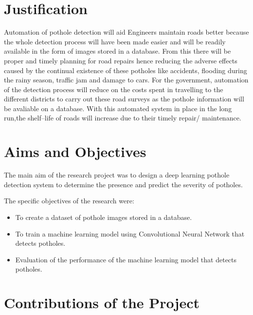 \documentclass[12pt]{report}
\begin{document}
\section{Justification}
Automation of pothole detection will aid Engineers maintain roads better because the whole detection process will have been made easier and will be readily available in the form of images stored in a database. From this there will be proper and timely planning for road repairs hence reducing the adverse effects caused by the continual existence of these potholes like accidents, flooding during the rainy season, traffic jam and damage to cars. For the government, automation of the detection process will reduce on the costs spent in travelling to the different districts to carry out these road surveys as the pothole information will be avaliable on a database. With this automated system in place in the long run,the shelf--life of roads will increase due to their timely repair/ maintenance.




\section{Aims and Objectives}

The main aim of the research project was to design a deep learning  pothole detection system to determine the presence and predict the severity of potholes.

The specific objectives of the research were:

\begin{itemize}[topsep=0pt]

\item To  create a dataset of pothole images stored in a database.

\item To  train a machine learning  model using Convolutional Neural Network that detects potholes.

\item Evaluation of the performance of the machine learning model  that detects potholes.


\end{itemize}









\section{Contributions of the Project}
\end{document}

